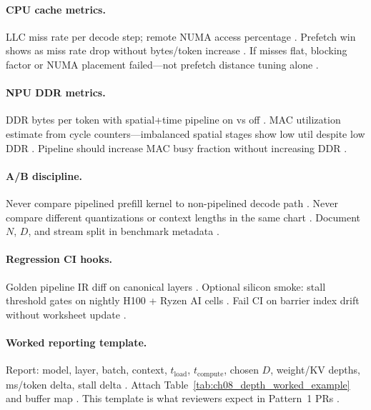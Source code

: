 \paragraph{CPU cache metrics.}
LLC miss rate per decode step; remote NUMA access percentage \citep{dlbook,patel2025llminference,memoryfloor2026}.
Prefetch win shows as miss rate drop without bytes/token increase \citep{yirage2026,taxbreak2026,kwon2023vllm}.
If misses flat, blocking factor or NUMA placement failed---not prefetch distance tuning alone \citep{chen2020compilerbasedhardw,dao2022flashattention}.

\paragraph{NPU DDR metrics.}
DDR bytes per token with spatial+time pipeline on vs off \citep{amd2024xdna,amd2024aie,memoryfloor2026}.
MAC utilization estimate from cycle counters---imbalanced spatial stages show low util despite low DDR \citep{patel2025llminference,yirage2026,amd2024aie}.
Pipeline should increase MAC busy fraction without increasing DDR \citep{taxbreak2026,chen2020compilerbasedhardw}.

\paragraph{A/B discipline.}
Never compare pipelined prefill kernel to non-pipelined decode path \citep{kwon2023vllm,shah2024flashattention3,taxbreak2026}.
Never compare different quantizations or context lengths in the same chart \citep{patel2025llminference,dao2022flashattention}.
Document $N$, $D$, and stream split in benchmark metadata \citep{yirage2026,chen2020compilerbasedhardw,memoryfloor2026}.

\paragraph{Regression CI hooks.}
Golden pipeline IR diff on canonical layers \citep{wu2024mirage,yirage2026,shah2024flashattention3}.
Optional silicon smoke: stall threshold gates on nightly H100 + Ryzen AI cells \citep{amd2024xdna,nvidia2022hopper,patel2025llminference}.
Fail CI on barrier index drift without worksheet update \citep{semianalysis2024tma,chen2020compilerbasedhardw,taxbreak2026}.

\paragraph{Worked reporting template.}
Report: model, layer, batch, context, $t_{\mathrm{load}}$, $t_{\mathrm{compute}}$, chosen $D$, weight/KV depths, ms/token delta, stall delta \citep{taxbreak2026,shah2024flashattention3,yirage2026}.
Attach Table~\ref{tab:ch08_depth_worked_example} and buffer map \citep{dao2022flashattention,chen2020compilerbasedhardw}.
This template is what reviewers expect in Pattern~1 PRs \citep{patel2025llminference,memoryfloor2026,mpk2025}.

